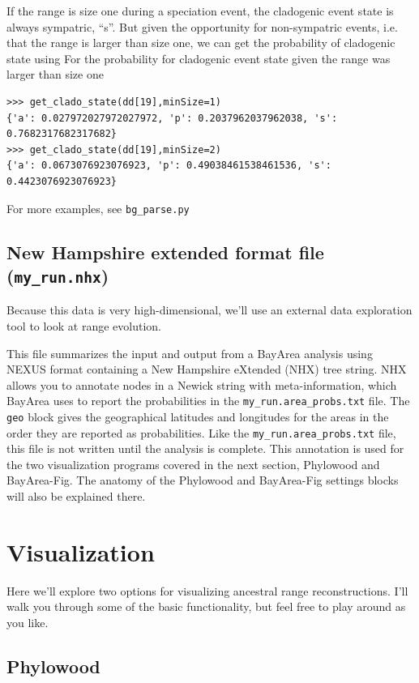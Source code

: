 \documentclass[11pt]{article}
\begin{document}
If the range is size one during a speciation event, the cladogenic event state is always sympatric, ``s''.
But given the opportunity for non-sympatric events, i.e. that the range is larger than size one, we can get the probability of cladogenic state using
For the probability for cladogenic event state given the range was larger than size one
\begin{snugshade}
\begin{lstlisting}
>>> get_clado_state(dd[19],minSize=1)
{'a': 0.027972027972027972, 'p': 0.2037962037962038, 's': 0.7682317682317682}
>>> get_clado_state(dd[19],minSize=2)
{'a': 0.0673076923076923, 'p': 0.49038461538461536, 's': 0.4423076923076923}
\end{lstlisting}
\end{snugshade}

For more examples, see {\tt bg\_parse.py}

\subsection{New Hampshire extended format file (\texttt{my\_run.nhx})}

Because this data is very high-dimensional, we'll use an external data exploration tool to look at range evolution.

This file summarizes the input and output from a BayArea analysis using NEXUS format containing a New Hampshire eXtended (NHX) tree string.
NHX allows you to annotate nodes in a Newick string with meta-information, which BayArea uses to report the probabilities in the \texttt{my\_run.area\_probs.txt} file.
The \texttt{geo} block gives the geographical latitudes and longitudes for the areas in the order they are reported as probabilities.
Like the \texttt{my\_run.area\_probs.txt} file, this file is not written until the analysis is complete.
This annotation is used for the two visualization programs covered in the next section, Phylowood and BayArea-Fig.
The anatomy of the Phylowood and BayArea-Fig settings blocks will also be explained there.

\section{Visualization}

Here we'll explore two options for visualizing ancestral range reconstructions.
I'll walk you through some of the basic functionality, but feel free to play around as you like.

\subsection{Phylowood}
\end{document}
